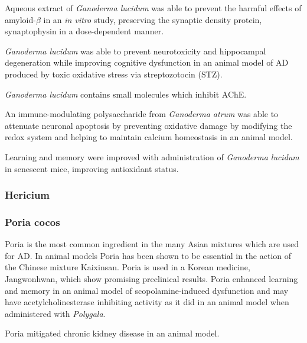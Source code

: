 \documentclass[twocolumn]{article}
\begin{document}
Aqueous extract of \textit{Ganoderma lucidum}
was able to prevent the harmful effects of
amyloid-$\beta$ in an \textit{in vitro} study,
preserving the synaptic density protein, synaptophysin
in a dose-dependent manner.
\cite{lai2008antagonizing}

\textit{Ganoderma lucidum} was able to prevent neurotoxicity and
hippocampal degeneration while improving cognitive dysfunction in an animal model
of AD produced by toxic oxidative stress via streptozotocin (STZ).
\cite{zhou2012neuroprotective}

\textit{Ganoderma lucidum} contains small molecules which inhibit AChE.
\cite{lee2011selective}

An immune-modulating polysaccharide from \textit{Ganoderma atrum}
was able to attenuate neuronal apoptosis
by preventing oxidative damage by modifying the
redox system and helping to maintain calcium homeostasis
in an animal model.
\cite{li2011ganoderma}

Learning and memory were improved with
administration of \textit{Ganoderma lucidum}
in senescent mice,
improving antioxidant status.
\cite{wang2004effects}


\subsubsection{Hericium}





\subsubsection{Poria cocos}

Poria is the most common ingredient in the
many Asian mixtures which are used for AD.
In animal models Poria has been shown to be essential
in the action of the Chinese mixture Kaixinsan.
\cite{gao2010comparision}
Poria is used in a Korean medicine, Jangwonhwan,
which show promising preclinical results.
\cite{seo2010modified}
Poria enhanced learning and memory in an animal
model of scopolamine-induced dysfunction
\cite{zhang2012effects}
and may have acetylcholinesterase inhibiting activity
as it did in an animal model when administered with
\textit{Polygala}.
\cite{li2011experimental}


Poria mitigated chronic kidney disease in an animal model.
\cite{zhao2013urinary}
\end{document}

